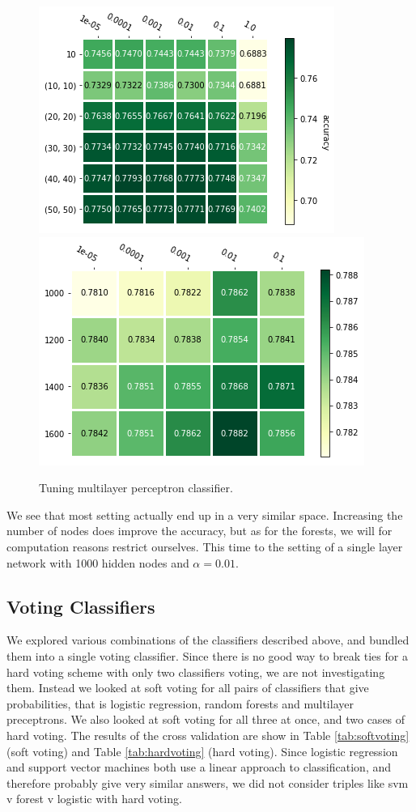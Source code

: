 \documentclass[parskip=half]{scrartcl}
\theoremstyle{definition}
\theoremstyle{remark}
\begin{document}
\begin{figure}[H]
\caption{Tuning multilayer perceptron classifier.}
\centering
\includegraphics[scale=0.6]{images/mlp_params1.png}
\includegraphics[scale=0.6]{images/mlp_params2.png}
\end{figure}

We see that most setting actually end up in a very similar space.
Increasing the number of nodes does improve the accuracy, but as for the forests, we will for computation reasons restrict ourselves.
This time to the setting of a single layer network with 1000 hidden nodes and $\alpha = 0.01$.

\subsection{Voting Classifiers}

We explored various combinations of the classifiers described above, and bundled them into a single voting classifier. 
Since there is no good way to break ties for a hard voting scheme with only two classifiers voting, we are not investigating them. 
Instead we looked at soft voting for all pairs of classifiers that give probabilities, that is logistic regression, random forests and multilayer preceptrons. 
We also looked at soft voting for all three at once, and two cases of hard voting. 
The results of the cross validation are show in Table \ref{tab:softvoting} (soft voting) and Table \ref{tab:hardvoting} (hard voting). 
Since logistic regression and support vector machines both use a linear approach to classification, and therefore probably give very similar answers, we did not consider triples like svm v forest v logistic with hard voting. 
\end{document}
